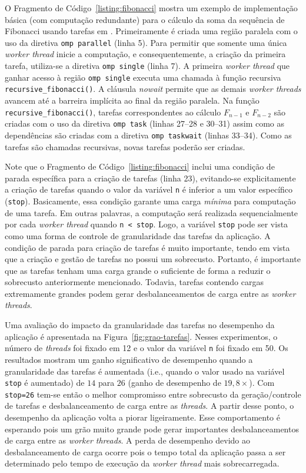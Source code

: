 \documentclass{SBCbookchapter}
\begin{document}
	O Fragmento de Código~\ref{listing:fibonacci} mostra um exemplo de
	implementação básica (com computação redundante) para o cálculo da soma da sequência de
	Fibonacci usando tarefas em \openmp. Primeiramente é criada uma
	região paralela com o uso da diretiva \texttt{omp parallel} (linha
	5). Para permitir que somente uma única \textit{worker thread}
	inicie a computação, e consequentemente, a criação da primeira
	tarefa, utiliza-se a diretiva \texttt{omp single} (linha 7). A
	primeira \textit{worker thread} que ganhar acesso à região
	\texttt{omp single} executa uma chamada à função recursiva
	\texttt{recursive\_fibonacci()}. A cláusula \textit{nowait} permite
	que as demais \textit{worker threads} avancem até a barreira
	implícita ao final da região paralela. Na função
	\texttt{recursive\_fibonacci()}, tarefas correspondentes ao cálculo
	$F_{n-1}$ e $F_{n-2}$ são criadas com o uso da diretiva \texttt{omp
	task} (linhas 27--28 e 30--31) assim como as dependências são
	criadas com a diretiva \texttt{omp taskwait} (linhas 33--34). Como as
	tarefas são chamadas recursivas, novas tarefas poderão
	ser criadas.
	
	Note que o Fragmento de Código~\ref{listing:fibonacci} inclui uma
	condição de parada específica para a criação de tarefas (linha 23),
	evitando-se explicitamente a criação de tarefas quando o valor da
	variável \texttt{n} é inferior a um valor específico
	(\texttt{stop}).  Basicamente, essa condição garante uma carga
	\textit{mínima} para computação de uma tarefa. Em outras palavras, a
	computação será realizada sequencialmente por cada \textit{worker
	thread} quando \texttt{n < stop}. Logo, a variável \texttt{stop}
	pode ser vista como uma forma de controle de granularidade das
	tarefas da aplicação.  A condição de parada para criação de tarefas
	é muito importante, tendo em vista que a criação e gestão de tarefas
	no \openmp possui um sobrecusto. Portanto, é importante
	que as tarefas tenham uma carga grande o suficiente de forma a
	reduzir o sobrecusto anteriormente mencionado. Todavia, tarefas
	contendo cargas extremamente grandes podem gerar desbalanceamentos
	de carga entre as \textit{worker threads}.

	Uma avaliação do impacto da granularidade das tarefas no desempenho
	da aplicação é apresentada na Figura~\ref{fig:grao-tarefas}. Nesses
	experimentos, o número de \textit{threads} foi fixado em 12 e o
	valor da variável \texttt{n} foi fixado em 50. Os resultados mostram um ganho
	significativo de desempenho quando a granularidade das tarefas é aumentada
	(i.e., quando o valor usado na variável \texttt{stop} é aumentado) de $14$ para $26$
	(ganho de desempenho de $19,8\times$).  Com \texttt{stop=26} tem-se então o
	melhor compromisso entre sobrecusto da geração/controle de tarefas e
	desbalanceamento de carga entre as \textit{threads}. A partir desse
	ponto, o desempenho da aplicação volta a piorar ligeiramente. Esse
	comportamento é esperando pois um grão muito grande pode gerar
	importantes desbalanceamentos de carga entre as \textit{worker threads}. A perda de
	desempenho devido ao desbalanceamento de carga ocorre pois o tempo total
	da aplicação passa a ser determinado pelo tempo de execução da \textit{worker thread}
	mais sobrecarregada.
\end{document}
